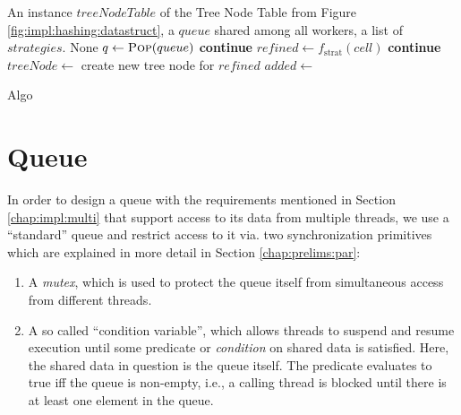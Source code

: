 		\begin{algorithm}[ht!]
			\centering
			\begin{algorithmic}
				\Require An instance $treeNodeTable$ of the Tree Node Table from Figure \ref{fig:impl:hashing:datastruct}, a $queue$ shared among all workers, a list of $strategies$.
				\Ensure None
				\Statex
							\State \Return {}
						\EndIf
						\State $q \gets \Call{Pop}{queue}$
									\State \textbf{continue}
								\EndIf
								\State $refined \gets f_{\mathrm{strat}}(cell)$
									\State \textbf{continue}
								\EndIf
								\State $treeNode \gets$ create new tree node for $refined$
								\State $added \gets $ 
								 
									\State {}
								\EndIf
							\EndFor
						\EndFor
					\EndWhile
				\EndFunction
			\end{algorithmic}
			\caption{Algo}
			\label{algo:impl:queue}
		\end{algorithm}

		\clearpage

		\section{Queue}
		\label{chap:impl:threading:queue}

			In order to design a queue with the requirements mentioned in Section \ref{chap:impl:multi} that support access to its data from multiple threads, we use a \enquote{standard} queue and restrict access to it via. two synchronization primitives which are explained in more detail in Section \ref{chap:prelims:par}:

			\begin{enumerate}
				\item A \textit{mutex}, which is used to protect the queue itself from simultaneous access from different threads.
				\item A so called \enquote{condition variable}, which allows threads to suspend and resume execution until some predicate or \textit{condition} on shared data is satisfied. Here, the shared data in question is the queue itself. The predicate evaluates to true iff the queue is non-empty, i.e., a calling thread is blocked until there is at least one element in the queue.
			\end{enumerate}

